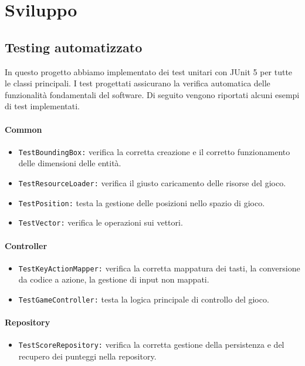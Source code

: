 \documentclass[a4paper,12pt]{report}
\begin{document}
\chapter{Sviluppo}
\section{Testing automatizzato}
In questo progetto abbiamo implementato dei test unitari con JUnit 5 per tutte le classi principali. I test progettati assicurano la verifica automatica delle funzionalità fondamentali
del software. Di seguito vengono riportati alcuni esempi di test implementati.

\subsubsection*{Common}
\begin{itemize}
	\item \texttt{TestBoundingBox:} verifica la corretta creazione e il corretto funzionamento delle dimensioni delle entità.
	\item \texttt{TestResourceLoader:} verifica il giusto caricamento delle risorse del gioco.
	\item \texttt{TestPosition:} testa la gestione delle posizioni nello spazio di gioco.
	\item \texttt{TestVector:} verifica le operazioni sui vettori.
\end{itemize}

\subsubsection*{Controller}
\begin{itemize}
	\item \texttt{TestKeyActionMapper:} verifica la corretta mappatura dei tasti, la conversione da codice a azione, la gestione di input non mappati.
	\item \texttt{TestGameController:}  testa la logica principale di controllo del gioco.
\end{itemize}

\subsubsection*{Repository}
\begin{itemize}
	\item \texttt{TestScoreRepository:} verifica la corretta gestione della persistenza e del recupero dei punteggi nella repository.
\end{itemize}
\end{document}
